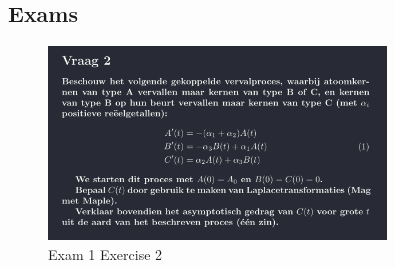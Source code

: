 \documentclass[a4paper]{report}
\begin{document}


\subsection{Exams}

\begin{figure}[H]
	\centering
	\includegraphics[width=0.8\textwidth]{assets/exam_1_ex_2.png}
	\caption{Exam 1 Exercise 2}
	\label{fig:exam_1_ex_2}
\end{figure}



\end{document}
